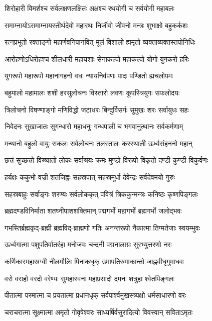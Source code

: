 \twolineshloka
{शिरोहारी विमर्शश्च सर्वलक्षणलक्षितः}%
{अक्षश्च रथयोगी च सर्वयोगी महाबलः}%

\twolineshloka
{समाम्नायोऽसमाम्नायस्तीर्थदेवो महारथः}%
{निर्जीवो जीवनो मन्त्रः शुभाक्षो बहुकर्कशः}%

\twolineshloka
{रत्नप्रभूतो रक्ताङ्गो महार्णवनिपानवित्}%
{मूलं विशालो ह्यमृतो व्यक्ताव्यक्तस्तपोनिधिः}%

\twolineshloka
{आरोहणोऽधिरोहश्च शीलधारी महायशाः}%
{सेनाकल्पो महाकल्पो योगो युगकरो हरिः}%

\twolineshloka
{युगरूपो महारूपो महानागहनो वधः}%
{न्यायनिर्वपणः पादः पण्डितो ह्यचलोपमः}%

\twolineshloka
{बहुमालो महामालः शशी हरसुलोचनः}%
{विस्तारो लवणः कूपस्त्रियुगः सफलोदयः}%

\twolineshloka
{त्रिलोचनो विषण्णाङ्गो मणिविद्धो जटाधरः}%
{बिन्दुर्विसर्गः सुमुखः शरः सर्वायुधः सहः}%

\twolineshloka
{निवेदनः सुखाजातः सुगन्धारो महाधनुः}%
{गन्धपाली च भगवानुत्थानः सर्वकर्मणाम्}%

\twolineshloka
{मन्थानो बहुलो वायुः सकलः सर्वलोचनः}%
{तलस्तालः करस्थाली ऊर्ध्वसंहननो महान्}%

\twolineshloka
{छत्त्रं सुच्छत्त्रो विख्यातो लोकः सर्वाश्रयः क्रमः}%
{मुण्डो विरूपो विकृतो दण्डी कुण्डी विकुर्वणः}%

\twolineshloka
{हर्यक्षः ककुभो वज्री शतजिह्वः सहस्रपात्}%
{सहस्रमूर्धा देवेन्द्रः सर्वदेवमयो गुरुः}%

\twolineshloka
{सहस्रबाहुः सर्वाङ्गः शरण्यः सर्वलोककृत्}%
{पवित्रं त्रिककुन्मन्त्रः कनिष्ठः कृष्णपिङ्गलः}%

\twolineshloka
{ब्रह्मदण्डविनिर्माता शतघ्नीपाशशक्तिमान्}%
{पद्मगर्भो महागर्भो ब्रह्मगर्भो जलोद्भवः}%

\twolineshloka
{गभस्तिर्ब्रह्मकृद्-ब्रह्मी ब्रह्मविद्-ब्राह्मणो गतिः}%
{अनन्तरूपो नैकात्मा तिग्मतेजाः स्वयम्भुवः}%

\twolineshloka
{ऊर्ध्वगात्मा पशुपतिर्वातरंहा मनोजवः}%
{चन्दनी पद्मनालाग्रः सुरभ्युत्तरणो नरः}%

\twolineshloka
{कर्णिकारमहास्रग्वी नीलमौलिः पिनाकधृक्}%
{उमापतिरुमाकान्तो जाह्नवीधृगुमाधवः}%

\twolineshloka
{वरो वराहो वरदो वरेण्यः सुमहास्वनः}%
{महाप्रसादो दमनः शत्रुहा श्वेतपिङ्गलः}%

\twolineshloka
{पीतात्मा परमात्मा च प्रयतात्मा प्रधानधृक्}%
{सर्वपार्श्वमुखस्त्र्यक्षो धर्मसाधारणो वरः}%

\twolineshloka
{चराचरात्मा सूक्ष्मात्मा अमृतो गोवृषेश्वरः}%
{साध्यर्षिर्वसुरादित्यो विवस्वान् सविताऽमृतः}%

